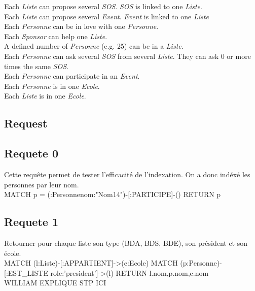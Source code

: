 \documentclass[a4paper,oneside,1pt]{article}
\begin{document}
Each \textit{Liste} can propose several \textit{SOS}. \textit{SOS} is linked to one \textit{Liste}. \\
Each \textit{Liste} can propose several \textit{Event}. \textit{Event} is linked to one \textit{Liste} \\
Each \textit{Personne} can be in love with one \textit{Personne}. \\
Each \textit{Sponsor} can help one \textit{Liste}. \\
A defined number of \textit{Personne} (e.g. 25) can be in a \textit{Liste}. \\
Each \textit{Personne} can ask several \textit{SOS} from several \textit{Liste}. They can ask 0 or more times the same \textit{SOS}. \\
Each \textit{Personne} can participate in an \textit{Event}. \\
Each \textit{Personne} is in one \textit{Ecole}. \\
Each \textit{Liste} is in one \textit{Ecole}. \\

\subsection{Request}


\subsection{Requete 0}
Cette requête permet de tester l'efficacité de l'indexation. On a donc indéxé les personnes par leur nom.
\\
MATCH p = (:Personne{nom:"Nom14"})-[:PARTICIPE]-() RETURN p

\subsection{Requete 1}
Retourner pour chaque liste son type (BDA, BDS, BDE), son président et son école.
\\
MATCH (l:Liste)-[:APPARTIENT]->(e:Ecole)
MATCH (p:Personne)-[:EST_LISTE {role:'president'}]->(l)
RETURN l.nom,p.nom,e.nom
\\WILLIAM EXPLIQUE STP ICI
\end{document}
